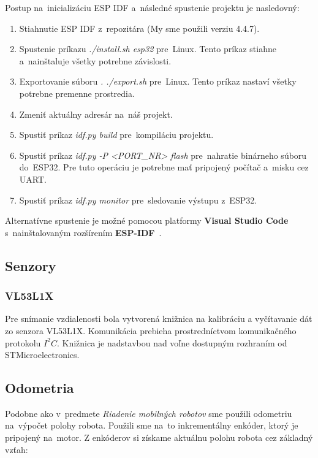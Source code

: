 Postup na~inicializáciu ESP IDF a~následné spustenie projektu je nasledovný:
\begin{enumerate}
	\item Stiahnutie ESP IDF z~repozitára \cite{espGithub} (My sme použili verziu 4.4.7).
	\item Spustenie príkazu \textit{./install.sh esp32} pre~Linux.
		Tento príkaz stiahne a~nainštaluje všetky potrebne závislosti.
	\item Exportovanie súboru \textit{. ./export.sh} pre~Linux.
		Tento príkaz nastaví všetky potrebne premenne prostredia.
	\item Zmeniť aktuálny adresár na~náš projekt.
	\item Spustiť príkaz \textit{idf.py build} pre~kompiláciu projektu.
	\item Spustiť príkaz \textit{idf.py -P <PORT\_NR> flash} pre~nahratie binárneho súboru do~ESP32.
		Pre tuto operáciu je potrebne mať pripojený počítač a~misku cez UART.
	\item Spustiť príkaz \textit{idf.py monitor} pre~sledovanie výstupu z~ESP32.
\end{enumerate}

Alternatívne spustenie je možné pomocou platformy \textbf{Visual Studio Code} s~nainštalovaným rozšírením
\textbf{ESP-IDF}~\cite{espIDF}.

\subsection{Senzory}

\subsubsection{VL53L1X}
Pre snímanie vzdialenosti bola vytvorená knižnica na kalibráciu a vyčítavanie dát zo senzora VL53L1X. Komunikácia prebieha prostredníctvom komunikačného protokolu $I^2 C$. Knižnica je nadstavbou nad voľne dostupným rozhraním od STMicroelectronics.

\subsection{Odometria}
\label{subsec:odometria}

Podobne ako v~predmete \textit{Riadenie mobilných robotov} sme použili odometriu na~výpočet polohy robota.
Použili sme na~to inkrementálny enkóder, ktorý je pripojený na~motor. Z enkóderov si získame aktuálnu polohu robota
cez základný vzťah:

